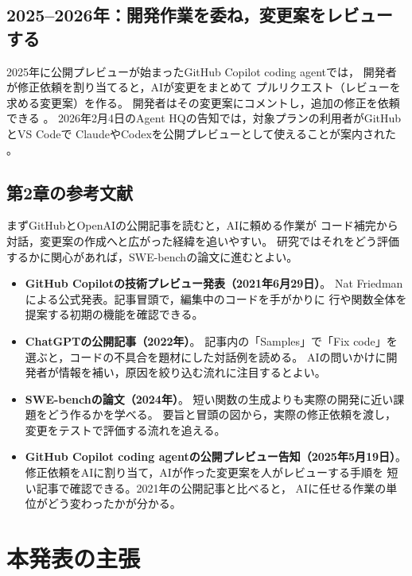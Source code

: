 \documentclass[platex]{jlreq}
\begin{document}
\subsection{2025--2026年：開発作業を委ね，変更案をレビューする}

2025年に公開プレビューが始まったGitHub Copilot coding agentでは，
開発者が修正依頼を割り当てると，AIが変更をまとめて
プルリクエスト（レビューを求める変更案）を作る。
開発者はその変更案にコメントし，追加の修正を依頼できる
\cite{github2025codingagent}。
2026年2月4日のAgent HQの告知では，対象プランの利用者がGitHubとVS Codeで
ClaudeやCodexを公開プレビューとして使えることが案内された
\cite{github2026agenthq}。

\subsection{第2章の参考文献}

まずGitHubとOpenAIの公開記事を読むと，AIに頼める作業が
コード補完から対話，変更案の作成へと広がった経緯を追いやすい。
研究ではそれをどう評価するかに関心があれば，SWE-benchの論文に進むとよい。

\begin{itemize}
  \item \textbf{GitHub Copilotの技術プレビュー発表（2021年6月29日）}\cite{github2021copilot}。
        Nat Friedmanによる公式発表。記事冒頭で，編集中のコードを手がかりに
        行や関数全体を提案する初期の機能を確認できる。
  \item \textbf{ChatGPTの公開記事（2022年）}\cite{openai2022chatgpt}。
        記事内の「Samples」で「Fix code」を選ぶと，コードの不具合を題材にした対話例を読める。
        AIの問いかけに開発者が情報を補い，原因を絞り込む流れに注目するとよい。
  \item \textbf{SWE-benchの論文（2024年）}\cite{jimenez2024swebench}。
        短い関数の生成よりも実際の開発に近い課題をどう作るかを学べる。
        要旨と冒頭の図から，実際の修正依頼を渡し，変更をテストで評価する流れを追える。
  \item \textbf{GitHub Copilot coding agentの公開プレビュー告知（2025年5月19日）}\cite{github2025codingagent}。
        修正依頼をAIに割り当て，AIが作った変更案を人がレビューする手順を
        短い記事で確認できる。2021年の公開記事と比べると，
        AIに任せる作業の単位がどう変わったかが分かる。
\end{itemize}

\section{本発表の主張}
\end{document}
